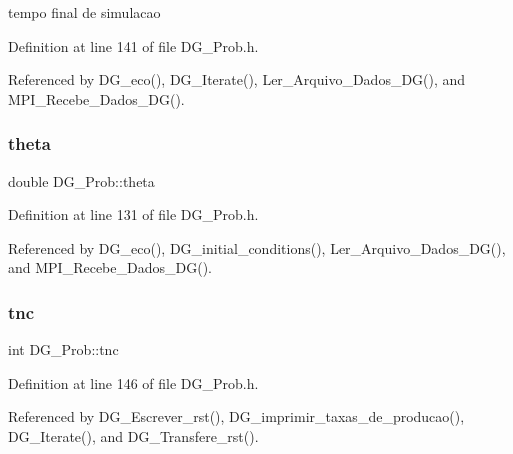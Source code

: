 tempo final de simulacao 



Definition at line 141 of file D\+G\+\_\+\+Prob.\+h.



Referenced by D\+G\+\_\+eco(), D\+G\+\_\+\+Iterate(), Ler\+\_\+\+Arquivo\+\_\+\+Dados\+\_\+\+D\+G(), and M\+P\+I\+\_\+\+Recebe\+\_\+\+Dados\+\_\+\+D\+G().

\mbox{\label{classDG__Prob_a652258d60768a84ea2867c94246f3323}} 
\subsubsection{\texorpdfstring{theta}{theta}}
{\footnotesize\ttfamily double D\+G\+\_\+\+Prob\+::theta\hspace{0.3cm}{\ttfamily [private]}}



Definition at line 131 of file D\+G\+\_\+\+Prob.\+h.



Referenced by D\+G\+\_\+eco(), D\+G\+\_\+initial\+\_\+conditions(), Ler\+\_\+\+Arquivo\+\_\+\+Dados\+\_\+\+D\+G(), and M\+P\+I\+\_\+\+Recebe\+\_\+\+Dados\+\_\+\+D\+G().

\mbox{\label{classDG__Prob_a92c7fcafcecaceddd9be64275e32772c}} 
\subsubsection{\texorpdfstring{tnc}{tnc}}
{\footnotesize\ttfamily int D\+G\+\_\+\+Prob\+::tnc\hspace{0.3cm}{\ttfamily [private]}}



Definition at line 146 of file D\+G\+\_\+\+Prob.\+h.



Referenced by D\+G\+\_\+\+Escrever\+\_\+rst(), D\+G\+\_\+imprimir\+\_\+taxas\+\_\+de\+\_\+producao(), D\+G\+\_\+\+Iterate(), and D\+G\+\_\+\+Transfere\+\_\+rst().

\mbox{\label{classDG__Prob_a6f90c501c5168021ad92a7992a7c7999}} 
